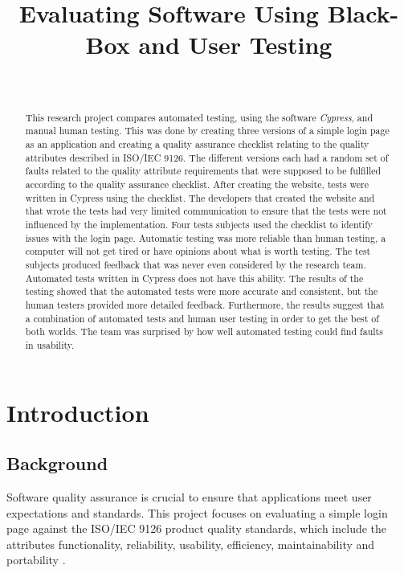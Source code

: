 \documentclass[journal,twocolumn]{IEEEtran}
\title{Evaluating Software Using Black-Box and User Testing}
\author{\IEEEauthorblockN{Oliver Levay, Kristina Sedelius, Adam Tegelberg, Emma Haggren}
\\
\IEEEauthorblockA{\textit{Lunds tekniska högskola} \\
\textit{Lund University}\\
Lund, Sweden \\
(ol1662le-s, kr0363se-s, ad3444te-s, em5261ha-s)@student.lu.se}
}
\begin{document}
\maketitle
\IEEEpeerreviewmaketitle

\begin{abstract}
    This research project compares automated testing, using the software \textit{Cypress}, and manual human testing. This was done by creating three versions of a simple login page as an application and creating a quality assurance checklist relating to the quality attributes described in ISO/IEC 9126. The different versions each had a random set of faults related to the quality attribute requirements that were supposed to be fulfilled according to the quality assurance checklist. After creating the website, tests were written in Cypress using the checklist. The developers that created the website and that wrote the tests had very limited communication to ensure that the tests were not influenced by the implementation. Four tests subjects used the checklist to identify issues with the login page. Automatic testing was more reliable than human testing, a computer will not get tired or have opinions about what is worth testing. The test subjects produced feedback that was never even considered by the research team. Automated tests written in Cypress does not have this ability. The results of the testing showed that the automated tests were more accurate and consistent, but the human testers provided more detailed feedback. Furthermore, the results suggest that a combination of automated tests and human user testing in order to get the best of both worlds. The team was surprised by how well automated testing could find faults in usability.
\end{abstract}

\section{Introduction}
\subsection{Background}
Software quality assurance is crucial to ensure that applications meet user expectations and standards. This project focuses on evaluating a simple login page against the ISO/IEC 9126 product quality standards, which include the attributes functionality, reliability, usability, efficiency, maintainability and portability \cite{ISO}.
\end{document}
